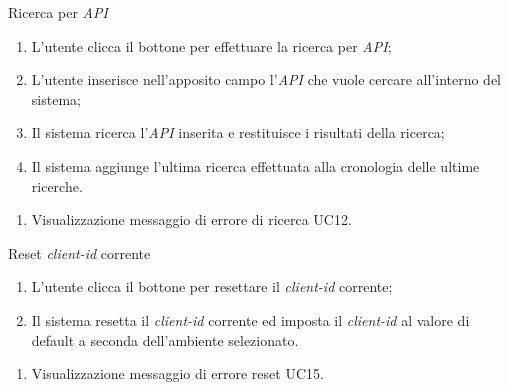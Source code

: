 \clearpage
\begin{usecase}{13}{Ricerca per \textit{API}}\label{uc:ricerca-api}

    \usecasemain{}
        \begin{enumerate}
            \item L'utente clicca il bottone per effettuare la ricerca per \textit{API};
            \item L'utente inserisce nell'apposito campo l'\textit{API} che vuole cercare all'interno del sistema;
            \item Il sistema ricerca l'\textit{API} inserita e restituisce i risultati della ricerca;
            \item Il sistema aggiunge l'ultima ricerca effettuata alla cronologia delle ultime ricerche.
        \end{enumerate}

    \usecaseext{}
        \begin{enumerate}
            \item Visualizzazione messaggio di errore di ricerca UC12.
        \end{enumerate}

\end{usecase}


\begin{usecase}{14}{Reset \textit{client-id} corrente}\label{uc:reset-client-id}

    \usecasemain{}
        \begin{enumerate}
            \item L'utente clicca il bottone per resettare il \textit{client-id} corrente;
            \item Il sistema resetta il \textit{client-id} corrente ed imposta il \textit{client-id} al valore di default a seconda dell'ambiente selezionato.
        \end{enumerate}
    \clearpage
    \usecaseext{}
        \begin{enumerate}
            \item Visualizzazione messaggio di errore reset UC15.
        \end{enumerate}

\end{usecase}


